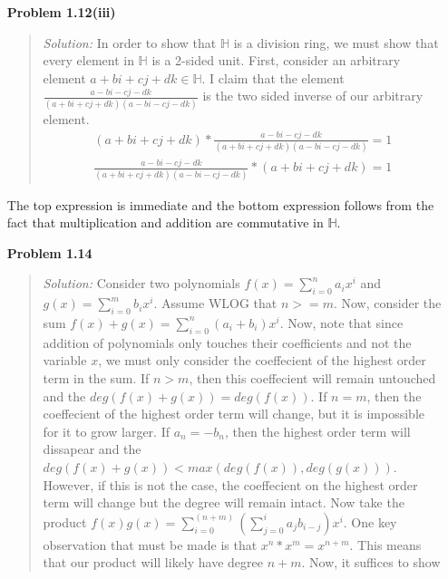 \documentclass{article}
\newcommand{\Solution}{\textit{Solution: }}
\begin{document}
\begin{enumerate}
\begin{quote}
            \end{quote} 
        \item[\textbf{Problem 1.12(iii)}]
            \begin{quote}
                \Solution In order to show that $\mathbb{H}$ is a division ring, we must show that every element in $\mathbb{H}$ is a 2-sided unit.
                First, consider an arbitrary element $a + bi + cj + dk \in \mathbb{H}$. I claim that the element $\frac{a-bi-cj-dk}{(a+bi+cj+dk)(a-bi-cj-dk)}$
                is the two sided inverse of our arbitrary element.
                \begin{equation*}
                    \begin{gathered}
                        (a + bi + cj + dk)*\frac{a-bi-cj-dk}{(a+bi+cj+dk)(a-bi-cj-dk)} = 1 \\
                        \frac{a-bi-cj-dk}{(a+bi+cj+dk)(a-bi-cj-dk)}*(a + bi + cj + dk) = 1
                    \end{gathered}
                \end{equation*}
            \end{quote}
            The top expression is immediate and the bottom expression follows from the fact that multiplication and addition are 
            commutative in $\mathbb{H}$. \qedsymbol
        \item[\textbf{Problem 1.14}]
            \begin{quote}
                \Solution Consider two polynomials $f(x) = \sum_{i = 0}^n a_ix^i$ and $g(x) = \sum_{i = 0}^m b_ix^i$. Assume WLOG that $n >= m$.
                Now, consider the sum $f(x) + g(x) = \sum_{i = 0}^n (a_i + b_i)x^i$. Now, note that since addition of polynomials only
                touches their coefficients and not the variable $x$, we must only consider the coeffecient of the highest order term in 
                the sum. If $n > m$, then this coeffecient will remain untouched and the $deg(f(x) + g(x)) = deg(f(x))$. If $n = m$, then
                the coeffecient of the highest order term will change, but it is impossible for it to grow larger. If $a_n = -b_n$, then 
                the highest order term will dissapear and the $deg(f(x) + g(x)) < max(deg(f(x)), deg(g(x)))$. However, if this is not the
                case, the coeffecient on the highest order term will change but the degree will remain intact.
                Now take the product $f(x)g(x) = \sum_{i = 0}^{(n+m)}(\sum_{j = 0}^ia_jb_{i-j})x^i$. One key observation that must be 
                made is that $x^n*x^m = x^{n+m}$. This means that our product will likely have degree $n+m$. Now, it suffices to show 

\end{quote}
\end{enumerate}
\end{document}
